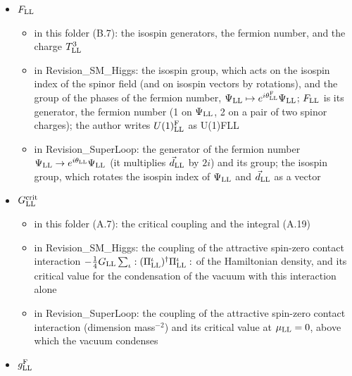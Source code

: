 \documentclass[
  10pt,
]{article}
\providecommand{\tightlist}{%
  \setlength{\itemsep}{0pt}\setlength{\parskip}{0pt}}
\begin{document}
\begin{itemize}
  \begin{itemize}
  \tightlist
  \item
    in this folder (B.7): the Dirac mass, the pair amplitude and the gap
    of the polar ground state
  \item
    in Revision\_SM\_Higgs: the gap of method \(X\) (the lowest energy
    of one quasi-particle) and the Dirac mass of its ground state
  \item
    in Revision\_SuperLoop: -- (not listed)
  \end{itemize}
\item
  \(F_{\rm LL}\)

  \begin{itemize}
  \tightlist
  \item
    in this folder (B.7): the isospin generators, the fermion number,
    and the charge \(T^3_{\rm LL}\)
  \item
    in Revision\_SM\_Higgs: the isospin group, which acts on the isospin
    index of the spinor field (and on isospin vectors by rotations), and
    the group of the phases of the fermion number,
    \(\Psi_{\rm LL}\mapsto e^{i\theta^{\rm F}_{\rm LL}}\Psi_{\rm LL}\);
    \(F_{\rm LL}\) is its generator, the fermion number (1 on
    \(\Psi_{\rm LL}\), 2 on a pair of two spinor charges); the author
    writes \(U(1)^{\rm F}_{\rm LL}\) as U(1)FLL
  \item
    in Revision\_SuperLoop: the generator of the fermion number
    \(\Psi_{\rm LL}\to e^{i\theta_{\rm LL}}\Psi_{\rm LL}\) (it
    multiplies \(\vec d_{\rm LL}\) by \(2i\)) and its group; the isospin
    group, which rotates the isospin index of \(\Psi_{\rm LL}\) and
    \(\vec d_{\rm LL}\) as a vector
  \end{itemize}
\item
  \(G^{\rm crit}_{\rm LL}\)

  \begin{itemize}
  \tightlist
  \item
    in this folder (A.7): the critical coupling and the integral (A.19)
  \item
    in Revision\_SM\_Higgs: the coupling of the attractive spin-zero
    contact interaction
    \(-\tfrac14G_{\rm LL}\sum_\iota:(\Pi^\iota_{\rm LL})^\dagger\Pi^\iota_{\rm LL}:\)
    of the Hamiltonian density, and its critical value for the
    condensation of the vacuum with this interaction alone
  \item
    in Revision\_SuperLoop: the coupling of the attractive spin-zero
    contact interaction (dimension mass\(^{-2}\)) and its critical value
    at \(\mu_{\rm LL}=0\), above which the vacuum condenses
  \end{itemize}
\item
  \(g^{\rm F}_{\rm LL}\)


\end{itemize}
\end{document}
